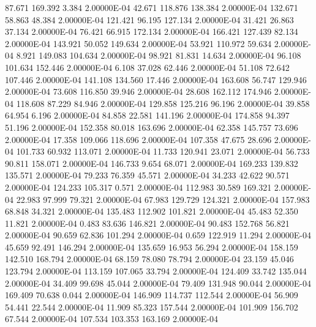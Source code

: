    87.671   169.392     3.384  2.00000E-04
    42.671   118.876   138.384  2.00000E-04
   132.671    58.863    48.384  2.00000E-04
   121.421    96.195   127.134  2.00000E-04
    31.421    26.863    37.134  2.00000E-04
    76.421    66.915   172.134  2.00000E-04
   166.421   127.439    82.134  2.00000E-04
   143.921    50.052   149.634  2.00000E-04
    53.921   110.972    59.634  2.00000E-04
     8.921   149.083   104.634  2.00000E-04
    98.921    81.831    14.634  2.00000E-04
    96.108   101.634   152.446  2.00000E-04
     6.108    37.028    62.446  2.00000E-04
    51.108    72.642   107.446  2.00000E-04
   141.108   134.560    17.446  2.00000E-04
   163.608    56.747   129.946  2.00000E-04
    73.608   116.850    39.946  2.00000E-04
    28.608   162.112   174.946  2.00000E-04
   118.608    87.229    84.946  2.00000E-04
   129.858   125.216    96.196  2.00000E-04
    39.858    64.954     6.196  2.00000E-04
    84.858    22.581   141.196  2.00000E-04
   174.858    94.397    51.196  2.00000E-04
   152.358    80.018   163.696  2.00000E-04
    62.358   145.757    73.696  2.00000E-04
    17.358   109.066   118.696  2.00000E-04
   107.358    47.675    28.696  2.00000E-04
   101.733    60.932   113.071  2.00000E-04
    11.733   120.941    23.071  2.00000E-04
    56.733    90.811   158.071  2.00000E-04
   146.733     9.654    68.071  2.00000E-04
   169.233   139.832   135.571  2.00000E-04
    79.233    76.359    45.571  2.00000E-04
    34.233    42.622    90.571  2.00000E-04
   124.233   105.317     0.571  2.00000E-04
   112.983    30.589   169.321  2.00000E-04
    22.983    97.999    79.321  2.00000E-04
    67.983   129.729   124.321  2.00000E-04
   157.983    68.848    34.321  2.00000E-04
   135.483   112.902   101.821  2.00000E-04
    45.483    52.350    11.821  2.00000E-04
     0.483    83.636   146.821  2.00000E-04
    90.483   152.768    56.821  2.00000E-04
    90.659    62.836   101.294  2.00000E-04
     0.659   122.919    11.294  2.00000E-04
    45.659    92.491   146.294  2.00000E-04
   135.659    16.953    56.294  2.00000E-04
   158.159   142.510   168.794  2.00000E-04
    68.159    78.080    78.794  2.00000E-04
    23.159    45.046   123.794  2.00000E-04
   113.159   107.065    33.794  2.00000E-04
   124.409    33.742   135.044  2.00000E-04
    34.409    99.698    45.044  2.00000E-04
    79.409   131.948    90.044  2.00000E-04
   169.409    70.638     0.044  2.00000E-04
   146.909   114.737   112.544  2.00000E-04
    56.909    54.441    22.544  2.00000E-04
    11.909    85.323   157.544  2.00000E-04
   101.909   156.702    67.544  2.00000E-04
   107.534   103.353   163.169  2.00000E-04
